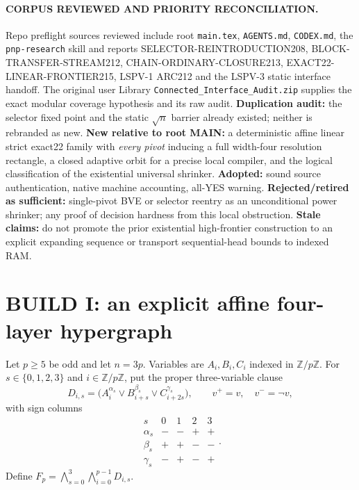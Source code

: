 \documentclass[11pt]{article}
\begin{document}
\paragraph{CORPUS REVIEWED AND PRIORITY RECONCILIATION.}
Repo preflight sources reviewed include root \texttt{main.tex}, \texttt{AGENTS.md}, \texttt{CODEX.md}, the \texttt{pnp-research} skill and reports SELECTOR-REINTRODUCTION208, BLOCK-TRANSFER-STREAM212, CHAIN-ORDINARY-CLOSURE213, EXACT22-LINEAR-FRONTIER215, LSPV-1 ARC212 and the LSPV-3 static interface handoff. The original user Library \texttt{Connected\_Interface\_Audit.zip} supplies the exact modular coverage hypothesis and its raw audit. \textbf{Duplication audit:} the selector fixed point and the static $\sqrt n$ barrier already existed; neither is rebranded as new. \textbf{New relative to root MAIN:} a deterministic affine linear strict exact22 family with \emph{every pivot} inducing a full width-four resolution rectangle, a closed adaptive orbit for a precise local compiler, and the logical classification of the existential universal shrinker. \textbf{Adopted:} sound source authentication, native machine accounting, all-YES warning. \textbf{Rejected/retired as sufficient:} single-pivot BVE or selector reentry as an unconditional power shrinker; any proof of decision hardness from this local obstruction. \textbf{Stale claims:} do not promote the prior existential high-frontier construction to an explicit expanding sequence or transport sequential-head bounds to indexed RAM.

\section{BUILD I: an explicit affine four-layer hypergraph}
Let $p\ge5$ be odd and let $n=3p$. Variables are $A_i,B_i,C_i$ indexed in $\mathbb Z/p\mathbb Z$. For $s\in\{0,1,2,3\}$ and $i\in\mathbb Z/p\mathbb Z$, put the proper three-variable clause
\[
 D_{i,s}=\bigl(A_i^{\alpha_s}\vee B_{i+s}^{\beta_s}\vee C_{i+2s}^{\gamma_s}\bigr),
 \qquad v^{+}=v,\quad v^{-}=\neg v,
\]
with sign columns
\[
\begin{array}{c|cccc}s&0&1&2&3\\\hline
\alpha_s&-&-&+&+\\
\beta_s&+&+&-&-\\
\gamma_s&-&+&-&+
\end{array}.
\]
Define $F_p=\bigwedge_{s=0}^3\bigwedge_{i=0}^{p-1}D_{i,s}$.
\end{document}
